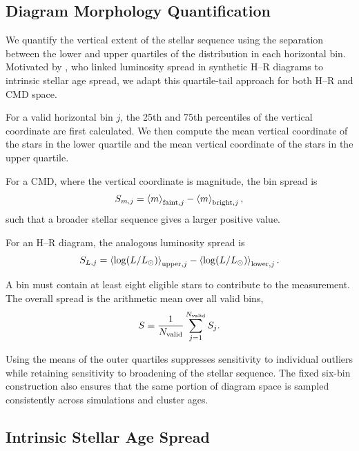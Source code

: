 \documentclass[linenumbers, twocolumn]{aastex631}
\begin{document}
\subsection{Diagram Morphology Quantification}
\label{sec:spread-metric}

We quantify the vertical extent of the stellar sequence using the separation between the lower and upper quartiles of the distribution in each horizontal bin. Motivated by \citet{Masegian2021}, who linked luminosity spread in synthetic H--R diagrams to intrinsic stellar age spread, we adapt this quartile-tail approach for both H--R and CMD space.

For a valid horizontal bin $j$, the 25th and 75th percentiles of the vertical coordinate are first calculated. We then compute the mean vertical coordinate of the stars in the lower quartile and the mean vertical coordinate of the stars in the upper quartile.

For a CMD, where the vertical coordinate is magnitude, the bin spread is
\begin{equation}
S_{m,j}
=
\left\langle m\right\rangle_{{\rm faint},j}
-
\left\langle m\right\rangle_{{\rm bright},j},
\end{equation}
such that a broader stellar sequence gives a larger positive value.

For an H--R diagram, the analogous luminosity spread is
\begin{equation}
S_{L,j}
=
\left\langle \log(L/L_\odot)\right\rangle_{{\rm upper},j}
-
\left\langle \log(L/L_\odot)\right\rangle_{{\rm lower},j}.
\end{equation}

A bin must contain at least eight eligible stars to contribute to the measurement. The overall spread is the arithmetic mean over all valid bins,
\begin{equation}
S
=
\frac{1}{N_{\rm valid}}
\sum_{j=1}^{N_{\rm valid}}S_j.
\end{equation}

Using the means of the outer quartiles suppresses sensitivity to individual outliers while retaining sensitivity to broadening of the stellar sequence. The fixed six-bin construction also ensures that the same portion of diagram space is sampled consistently across simulations and cluster ages.

\subsection{Intrinsic Stellar Age Spread}
\end{document}

